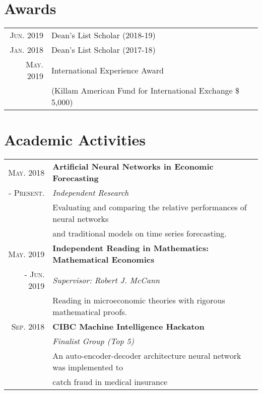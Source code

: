 \documentclass[a4paper,10pt]{article}
\begin{document}
\section{Awards}
\begin{tabular}{rl}
    \textsc{Jun.} 2019 & Dean's List Scholar (2018-19) \\
    \textsc{Jan.} 2018 & Dean's List Scholar (2017-18)\\
    \textsc{May.} 2019 & International Experience Award \\
    & (Killam American Fund for International Exchange \$ 5,000)\\
\end{tabular}

\section{Academic Activities}
\begin{tabular}{rl}
	\textsc{May.} 2018 & \textbf{Artificial Neural Networks in Economic Forecasting} \\
	- \textsc{Present.} & \emph{Independent Research} \\
	& \quad Evaluating and comparing the relative performances of neural networks \\
	& and traditional models on time series forecasting. \\
%
	\textsc{May.} 2019 & \textbf{Independent Reading in Mathematics: Mathematical Economics} \\
	- \textsc{Jun.} 2019 & \emph{Supervisor: Robert J. McCann} \\
	& \quad Reading in microeconomic theories with rigorous mathematical proofs.\\
%
    \textsc{Sep.} 2018 & \textbf{CIBC Machine Intelligence Hackaton} \\
    & \emph{Finalist Group (Top 5)} \\
    & \quad An auto-encoder-decoder architecture neural network was implemented to\\
    & catch fraud in medical insurance
\end{tabular}
\end{document}
